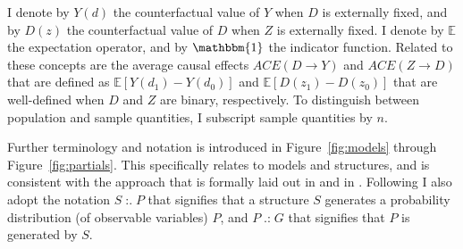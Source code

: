 \documentclass[10pt,a4paper,twoside]{article}
\DeclareMathOperator*{\generates}{:.}
\DeclareMathOperator*{\generated}{.:}
\numberwithin{equation}{subsection}
\begin{document}
I denote by $Y(d)$ the counterfactual value of $Y$ when $D$ is externally fixed, and by $D(z)$ the counterfactual value of $D$ when $Z$ is externally fixed. I denote by $\mathbb{E}$ the expectation operator, and  by $\mathbbm{1}$ the indicator function. Related to these concepts are the average causal effects $ACE(D\rightarrow Y)$ and $ACE(Z\rightarrow D)$ that are defined as $\mathbb{E}[Y(d_1)-Y(d_0)]$ and $\mathbb{E}[D(z_1)-D(z_0)]$ that are well-defined when $D$ and $Z$ are binary, respectively. To distinguish between population and sample quantities, I subscript sample quantities by $n$. 

Further terminology and notation is introduced in Figure~\ref{fig:models} through Figure~\ref{fig:partials}. This specifically relates to models and structures, and is consistent with the approach that is formally laid out in \cite{h50} and in \cite{krE50}. Following \cite{h50} I also adopt the notation $S\generates P$ that signifies that a structure $S$ generates a probability distribution (of observable variables) $P$, and $P\generated G$ that signifies that $P$ is generated by $S$. 
\end{document}
